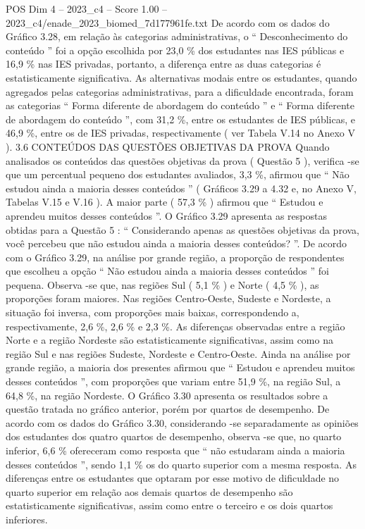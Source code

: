 \begin{textsample}{POS Dim 4 – 2023\_c4 – Score 1.00 – 2023\_c4/enade\_2023\_biomed\_7d177961fe.txt}
De acordo com os dados do Gráfico 3.28, em relação às categorias administrativas, o “ Desconhecimento do conteúdo ” foi a opção escolhida por 23,0 \% dos estudantes nas IES públicas e 16,9 \% nas IES privadas, portanto, a diferença entre as duas categorias é estatisticamente significativa.
As alternativas modais entre os estudantes, quando agregados pelas categorias administrativas, para a dificuldade encontrada, foram as categorias “ Forma diferente de abordagem do conteúdo ” e “ Forma diferente de abordagem do conteúdo ”, com 31,2 \%, entre os estudantes de IES públicas, e 46,9 \%, entre os de IES privadas, respectivamente ( ver Tabela V.14 no Anexo V ). 3.6 CONTEÚDOS DAS QUESTÕES OBJETIVAS DA PROVA Quando analisados os conteúdos das questões objetivas da prova ( Questão 5 ), verifica -se que um percentual pequeno dos estudantes avaliados, 3,3 \%, afirmou que “ Não estudou ainda a maioria desses conteúdos ” ( Gráficos 3.29 a 4.32 e, no Anexo V, Tabelas V.15 e V.16 ).
A maior parte ( 57,3 \% ) afirmou que “ Estudou e aprendeu muitos desses conteúdos ”.
O Gráfico 3.29 apresenta as respostas obtidas para a Questão 5 : “ Considerando apenas as questões objetivas da prova, você percebeu que não estudou ainda a maioria desses conteúdos? ”.
De acordo com o Gráfico 3.29, na análise por grande região, a proporção de respondentes que escolheu a opção “ Não estudou ainda a maioria desses conteúdos ” foi pequena.
Observa -se que, nas regiões Sul ( 5,1 \% ) e Norte ( 4,5 \% ), as proporções foram maiores.
Nas regiões Centro-Oeste, Sudeste e Nordeste, a situação foi inversa, com proporções mais baixas, correspondendo a, respectivamente, 2,6 \%, 2,6 \% e 2,3 \%.
As diferenças observadas entre a região Norte e a região Nordeste são estatisticamente significativas, assim como na região Sul e nas regiões Sudeste, Nordeste e Centro-Oeste.
Ainda na análise por grande região, a maioria dos presentes afirmou que “ Estudou e aprendeu muitos desses conteúdos ”, com proporções que variam entre 51,9 \%, na região Sul, a 64,8 \%, na região Nordeste.
O Gráfico 3.30 apresenta os resultados sobre a questão tratada no gráfico anterior, porém por quartos de desempenho.
De acordo com os dados do Gráfico 3.30, considerando -se separadamente as opiniões dos estudantes dos quatro quartos de desempenho, observa -se que, no quarto inferior, 6,6 \% ofereceram como resposta que “ não estudaram ainda a maioria desses conteúdos ”, sendo 1,1 \% os do quarto superior com a mesma resposta.
As diferenças entre os estudantes que optaram por esse motivo de dificuldade no quarto superior em relação aos demais quartos de desempenho são estatisticamente significativas, assim como entre o terceiro e os dois quartos inferiores.

\end{textsample}
